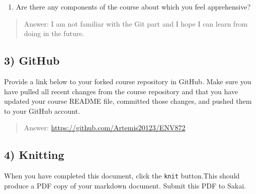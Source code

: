 \documentclass[
]{article}
\providecommand{\tightlist}{%
  \setlength{\itemsep}{0pt}\setlength{\parskip}{0pt}}
\begin{document}
\begin{enumerate}
\def\labelenumi{\arabic{enumi}.}
\setcounter{enumi}{2}
\tightlist
\item
  Are there any components of the course about which you feel
  apprehensive?
\end{enumerate}

\begin{quote}
Answer: I am not familiar with the Git part and I hope I can learn from
doing in the future.
\end{quote}

\hypertarget{github}{%
\subsection{3) GitHub}\label{github}}

Provide a link below to your forked course repository in GitHub. Make
sure you have pulled all recent changes from the course repository and
that you have updated your course README file, committed those changes,
and pushed them to your GitHub account.

\begin{quote}
Answer: \url{https://github.com/Artemis20123/ENV872}
\end{quote}

\hypertarget{knitting}{%
\subsection{4) Knitting}\label{knitting}}

When you have completed this document, click the \texttt{knit}
button.This should produce a PDF copy of your markdown document. Submit
this PDF to Sakai.
\end{document}
